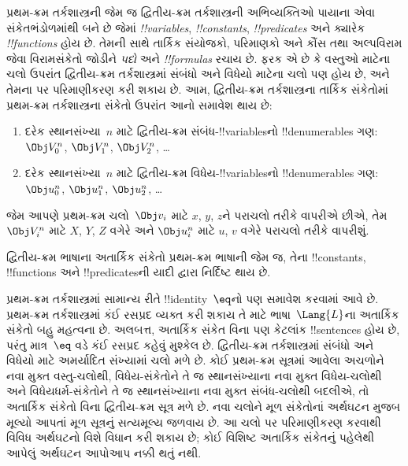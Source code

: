 \documentclass[../../../include/open-logic-section]{subfiles}
\begin{document}


પ્રથમ-ક્રમ તર્કશાસ્ત્રની જેમ જ દ્વિતીય-ક્રમ તર્કશાસ્ત્રની અભિવ્યક્તિઓ
પાયાના એવા સંકેતભંડોળમાંથી બને છે જેમાં \emph{!!{variable}s},
\emph{!!{constant}s}, \emph{!!{predicate}s} અને ક્યારેક
\emph{!!{function}s} હોય છે. તેમની સાથે તાર્કિક સંયોજકો, પરિમાણકો
અને કૌંસ તથા અલ્પવિરામ જેવા વિરામસંકેતો જોડીને \emph{પદો} અને
\emph{!!{formula}s} રચાય છે. ફરક એ છે કે વસ્તુઓ માટેના ચલો ઉપરાંત
દ્વિતીય-ક્રમ તર્કશાસ્ત્રમાં સંબંધો અને વિધેયો માટેના ચલો પણ હોય છે,
અને તેમના પર પરિમાણીકરણ કરી શકાય છે. આમ, દ્વિતીય-ક્રમ તર્કશાસ્ત્રના
તાર્કિક સંકેતોમાં પ્રથમ-ક્રમ તર્કશાસ્ત્રના સંકેતો ઉપરાંત આનો સમાવેશ થાય છે:

\begin{enumerate}
\item દરેક સ્થાનસંખ્યા~$n$ માટે દ્વિતીય-ક્રમ સંબંધ-!!{variable}sનો
  !!{denumerable}s ગણ: $\Obj V_0^n$, $\Obj V_1^n$, $\Obj V_2^n$, \dots
\item દરેક સ્થાનસંખ્યા~$n$ માટે દ્વિતીય-ક્રમ વિધેય-!!{variable}sનો
  !!{denumerable}s ગણ:
  $\Obj u_0^n$, $\Obj u_1^n$, $\Obj u_2^n$, \dots
\end{enumerate}

જેમ આપણે પ્રથમ-ક્રમ ચલો~$\Obj v_i$ માટે $x$, $y$, $z$ને પરાચલો
તરીકે વાપરીએ છીએ, તેમ~$\Obj V_i^n$ માટે $X$, $Y$, $Z$ વગેરે અને
$\Obj u_i^n$ માટે $u$, $v$ વગેરે પરાચલો તરીકે વાપરીશું.

\begin{explain}
દ્વિતીય-ક્રમ ભાષાના અતાર્કિક સંકેતો પ્રથમ-ક્રમ ભાષાની જેમ જ, તેના
!!{constant}s, !!{function}s અને !!{predicate}sની યાદી દ્વારા
નિર્દિષ્ટ થાય છે.

પ્રથમ-ક્રમ તર્કશાસ્ત્રમાં સામાન્ય રીતે !!{identity}~$\eq$નો પણ સમાવેશ
કરવામાં આવે છે. પ્રથમ-ક્રમ તર્કશાસ્ત્રમાં કંઈ રસપ્રદ વ્યક્ત કરી શકાય
તે માટે ભાષા~$\Lang{L}$ના અતાર્કિક સંકેતો બહુ મહત્વના છે. અલબત્ત,
અતાર્કિક સંકેત વિના પણ કેટલાંક !!{sentence}s હોય છે, પરંતુ માત્ર~$\eq$
વડે કંઈ રસપ્રદ કહેવું મુશ્કેલ છે. દ્વિતીય-ક્રમ તર્કશાસ્ત્રમાં સંબંધો
અને વિધેયો માટે અમર્યાદિત સંખ્યામાં ચલો મળે છે. કોઈ પ્રથમ-ક્રમ
સૂત્રમાં આવેલા અચળોને નવા મુક્ત વસ્તુ-ચલોથી, વિધેય-સંકેતોને તે જ
સ્થાનસંખ્યાના નવા મુક્ત વિધેય-ચલોથી અને વિધેયધર્મ-સંકેતોને તે જ
સ્થાનસંખ્યાના નવા મુક્ત સંબંધ-ચલોથી બદલીએ, તો અતાર્કિક સંકેતો વિના
દ્વિતીય-ક્રમ સૂત્ર મળે છે. નવા ચલોને મૂળ સંકેતોનાં અર્થઘટન મુજબ
મૂલ્યો આપતાં મૂળ સૂત્રનું સત્યમૂલ્ય જળવાય છે. આ ચલો પર પરિમાણીકરણ
કરવાથી વિવિધ અર્થઘટનો વિશે વિધાન કરી શકાય છે; કોઈ વિશિષ્ટ
અતાર્કિક સંકેતનું પહેલેથી આપેલું અર્થઘટન આપોઆપ નક્કી થતું નથી.
\end{explain}
\end{document}
